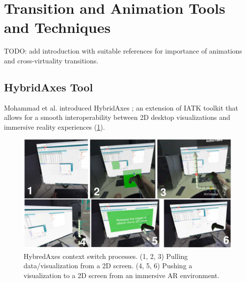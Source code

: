 \documentclass{vgtc}                          %
\begin{document}
\section{Transition and Animation Tools and Techniques}

TODO: add introduction with suitable references for importance of animations
and cross-virtuality transitions.
\subsection{HybridAxes Tool}
Mohammad et al. introduced HybridAxes \cite{hybridaxes_tool}; an extension of
IATK toolkit that allows for a smooth interoperability between 2D desktop
visualizations and immersive reality experiences (\ref{fig:hybridaxes}).

\medskip

\begin{figure}[tb]
	\centering
	\includegraphics[width=\columnwidth]{hybridaxes}
	\caption[Caption for RagRug]{HybredAxes context switch processes. (1, 2, 3)
		Pulling data/visualization from a 2D screen. (4, 5, 6) Pushing a
		visualization to a 2D screen from an immersive AR environment.}
	\label{fig:hybridaxes}
\end{figure}
\end{document}
